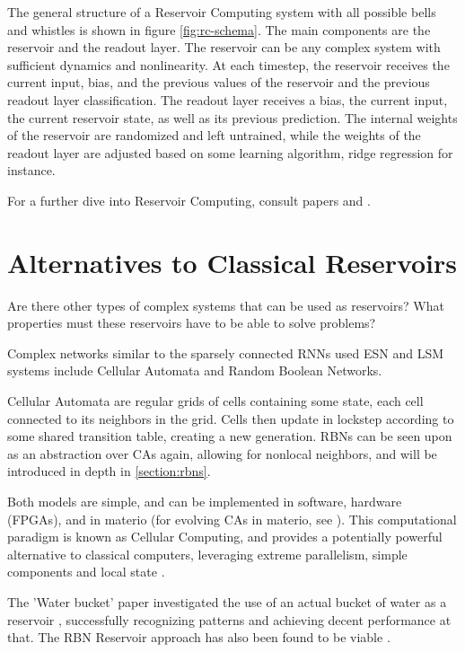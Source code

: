 The general structure of a Reservoir Computing system with all possible bells and whistles is shown in figure \ref{fig:rc-schema}.
The main components are the reservoir and the readout layer.
The reservoir can be any complex system with sufficient dynamics and nonlinearity.
At each timestep, the reservoir receives the current input, bias,
and the previous values of the reservoir and the previous readout layer classification.
The readout layer receives a bias, the current input, the current reservoir state, as well as its previous prediction.
The internal weights of the reservoir are randomized and left untrained,
while the weights of the readout layer are adjusted based on some learning algorithm,
ridge regression for instance.

For a further dive into Reservoir Computing,
consult papers \cite{Schrauwen2007} and \cite{lukovsevivcius2012reservoir}.

\section{Alternatives to Classical Reservoirs}

Are there other types of complex systems that can be used as reservoirs?
What properties must these reservoirs have to be able to solve problems?

Complex networks similar to the sparsely connected RNNs used  ESN and LSM systems include Cellular Automata and Random Boolean Networks.

Cellular Automata are regular grids of cells containing some state,
each cell connected to its neighbors in the grid.
Cells then update in lockstep according to some shared transition table,
creating a new generation.
RBNs can be seen upon as an abstraction over CAs again,
allowing for nonlocal neighbors, and will be introduced in depth in \ref{section:rbns}.

Both models are simple, and can be implemented in software,
hardware (FPGAs), and in materio \cite{miller2002evolution}
(for evolving CAs in materio, see \cite{farstad2015evolving}).
This computational paradigm is known as Cellular Computing,
and provides a potentially powerful alternative to classical computers,
leveraging extreme parallelism, simple components and local state \cite{sipper1999emergence}.

The 'Water bucket' paper investigated the use of an actual bucket of water as a reservoir \cite{fernando2003pattern},
successfully recognizing patterns and achieving decent performance at that.
The RBN Reservoir approach has also been found to be viable \cite{rbn-reservoir} .

